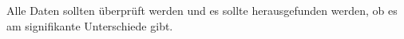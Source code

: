 Alle Daten sollten {\"u}berpr{\"u}ft werden und es sollte herausgefunden werden, ob es am signifikante Unterschiede gibt.























